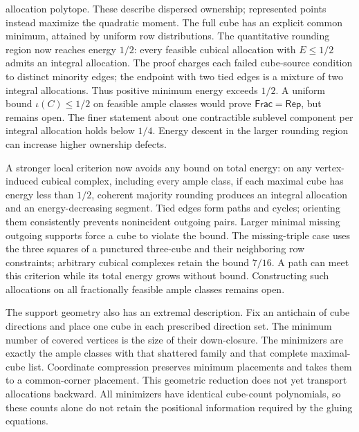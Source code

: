 \documentclass[11pt]{article}
\theoremstyle{definition}
\newcommand{\Rep}{\mathsf{Rep}}
\newcommand{\Frac}{\mathsf{Frac}}
\begin{document}
allocation polytope. These describe dispersed ownership; represented
points instead maximize the quadratic moment. The full cube has an
explicit common minimum, attained by uniform row distributions.
The quantitative rounding region now reaches energy $1/2$: every
feasible cubical allocation with $E\leq1/2$ admits an integral allocation.
The proof charges each failed cube-source condition to distinct minority
edges; the endpoint with two tied edges is a mixture of two integral
allocations. Thus positive minimum energy exceeds $1/2$. A uniform bound
$\iota(C)\leq1/2$ on feasible ample classes would prove $\Frac=\Rep$,
but remains open. The finer statement about one contractible sublevel
component per integral allocation holds below $1/4$. Energy descent
in the larger rounding region can increase higher ownership defects.

A stronger local criterion now avoids any bound on total energy:
on any vertex-induced cubical complex, including every ample class,
if each maximal cube has energy less than $1/2$, coherent majority
rounding produces an integral allocation and an energy-decreasing segment.
Tied edges form paths and cycles; orienting them consistently prevents
nonincident outgoing pairs. Larger minimal missing outgoing supports
force a cube to violate the bound. The missing-triple case uses the
three squares of a punctured three-cube and their neighboring row
constraints; arbitrary cubical complexes retain the bound $7/16$.
A path can meet this criterion while
its total energy grows without bound. Constructing such allocations on
all fractionally feasible ample classes remains open.

The support geometry also has an extremal description. Fix an antichain
of cube directions and place one cube in each prescribed direction set.
The minimum number of covered vertices is the size of their down-closure.
The minimizers are exactly the ample classes with that shattered family
and that complete maximal-cube list. Coordinate compression preserves
minimum placements and takes them to a common-corner placement. This
geometric reduction does not yet transport allocations backward. All
minimizers have identical cube-count polynomials, so these counts alone
do not retain the positional information required by the gluing equations.
\end{document}
